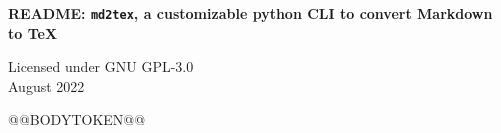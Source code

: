 \documentclass[a4paper, 12pt, twoside]{@@DOCUMENTCLASSTOKEN@@}
\begin{document}
\begin{centering}
    \vspace{2cm}
        \begin{large}
            \textbf{README: \texttt{md2tex}, a customizable python CLI to convert Markdown to TeX}
        \end{large}
        \bigskip
            Licensed under GNU GPL-3.0\\August 2022
    \vspace{2cm}
\end{centering}

@@BODYTOKEN@@

\clearpage
\tableofcontents
\end{document}
